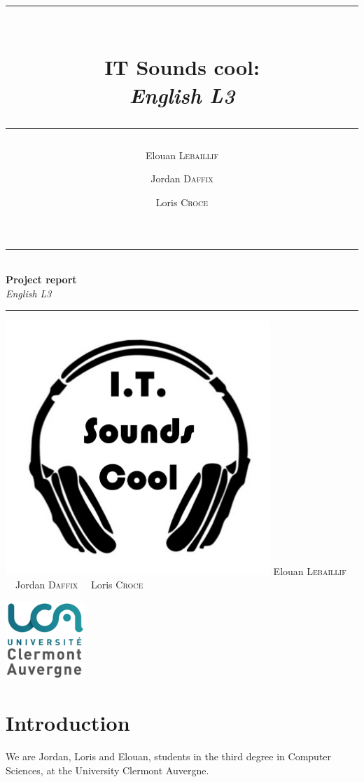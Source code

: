 \documentclass[12pt, a4paper]{article}
\author{Elouan \textsc{Lebaillif} \and Jordan \textsc{Daffix} \and Loris \textsc{Croce}}
\title{\rule{\textwidth}{1pt} \\ \Huge\textbf{IT Sounds cool: } \\ \emph{English L3} \rule{\textwidth}{1pt}}
\begin{document}
\begin{titlepage}
    \centering
    \vfill
    {
      \rule{\textwidth}{1pt} \\ 
      \Huge\textbf{Project report} \\ 
      \emph{English L3} \rule{\textwidth}{1pt}
    \includegraphics[width=10cm]{pictures/Logo.png} %
      \vfill
      {
        \small
        Elouan \textsc{Lebaillif} \ \ Jordan \textsc{Daffix} \ \ Loris \textsc{Croce}
      }
    }
    \vfill
    \includegraphics[width=3cm]{pictures/Logo-UCA.png} %
    \vfill
    \vfill
    \vfill
\end{titlepage}


\tableofcontents

\newpage

\section{Introduction}

We are Jordan, Loris and Elouan, students in the third degree in Computer Sciences, at the University Clermont Auvergne.
\end{document}

